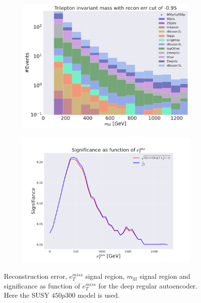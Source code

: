 \begin{figure}[H]
    \hfill
    \begin{subfigure}{.40\textwidth}
        \includegraphics[width=\textwidth]{Figures/AE_testing/big/3lep/b_data_recon_big_rm3_feats_sig_800p0p050p_mlll_recon_errcut_-0.95.pdf}
        \caption{}
        \label{fig:AE_3lep_big_mlll_800_2}
    \end{subfigure}
    \hfill   
    \begin{subfigure}{.40\textwidth}
        \includegraphics[width=\textwidth]{Figures/AE_testing/big/3lep/significance_etmiss_800p0p050p_-0.9544944422260757.pdf}
        \caption{}
        \label{fig:AE_3lep_big_signi_800_2}
    \end{subfigure}
    \hfill      
    \caption[3lep deep network | $800p50$ | AE | 2]{Reconstruction error, $e_T^{miss}$ signal region, $m_{lll}$ signal region and significance as function of 
    $e_T^{miss}$ for the deep regular autoencoder. Here the SUSY $450p300$ model is used.}
    \label{fig:AE_3lep_big_rec_sig_signi_800_2}
\end{figure}

